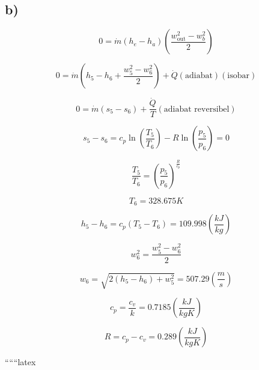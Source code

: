 

\subsection*{b)}


\[
0 = \dot{m} (h_e - h_a) \left( \frac{w_{\text{out}}^2 - w_b^2}{2} \right)
\]


\[
0 = \dot{m} (h_5 - h_6 + \frac{w_5^2 - w_6^2}{2}) + \dot{Q} \left( \text{adiabat} \right) \left( \text{isobar} \right)
\]

\[
0 = \dot{m} (s_5 - s_6) + \frac{\dot{Q}}{T} \left( \text{adiabat reversibel} \right)
\]

\[
s_5 - s_6 = c_p \ln \left( \frac{T_5}{T_6} \right) - R \ln \left( \frac{p_5}{p_6} \right) = 0
\]

\[
\frac{T_5}{T_6} = \left( \frac{p_5}{p_6} \right)^{\frac{R}{c_p}}
\]

\[
T_6 = 328.675 K
\]

\[
h_5 - h_6 = c_p (T_5 - T_6) = 109.998 \left( \frac{kJ}{kg} \right)
\]

\[
w_6^2 = \frac{w_5^2 - w_6^2}{2}
\]

\[
w_6 = \sqrt{2(h_5 - h_6) + w_5^2} = 507.29 \left( \frac{m}{s} \right)
\]

\[
c_p = \frac{c_v}{k} = 0.7185 \left( \frac{kJ}{kg K} \right)
\]

\[
R = c_p - c_v = 0.289 \left( \frac{kJ}{kg K} \right)
\]

``````latex